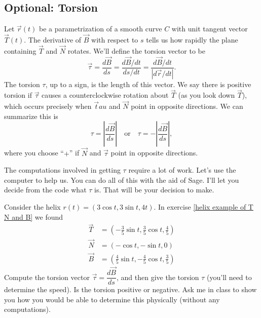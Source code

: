 \begin{challenge}
\begin{challenge}
\begin{challenge}
\subsection*{Optional: Torsion}


\begin{definition}[Torsion]
 Let $\vec r(t)$ be a parametrization of a smooth curve $C$ with unit tangent vector $\vec T(t)$.  
 The derivative of $\vec B$ with respect to $s$ tells us how rapidly the plane containing $\vec T$ and $\vec N$ rotates. We'll define the torsion vector to be 
%
 $$\vec \tau = \dfrac{d\vec B}{ds} = \dfrac{d\vec B/dt}{ds/dt}=\dfrac{d\vec B/dt}{|d\vec r/dt|}.$$ 
 The torsion $\tau$, up to a sign, is the length of this vector. We say there is positive torsion if $\vec \tau$ causes a counterclockwise rotation about $\vec T$ (as you look down $\vec T$), which occurs precisely when $\vec tau$ and $\vec N$ point in opposite directions. We can summarize this is $$\tau=\left|\dfrac{d\vec B}{ds}\right|\quad \text{or}\quad \tau=-\left|\dfrac{d\vec B}{ds}\right|,$$ where you choose ``$+$'' if $\vec N$ and $\vec \tau$ point in opposite directions. 
\end{definition}


The computations involved in getting $\tau$ require a lot of work. Let's use the computer to help us. You can do all of this with the aid of Sage.  I'll let you decide from the code what $\tau$ is.  That will be your decision to make. 

\begin{problem*}[Optional]
%
Consider the helix $r(t)=(3\cos t, 3\sin t, 4t)$. In exercise \ref{helix example of T N and B} we found 
\begin{align*}
 \vec T &= (-\frac{3}{5}\sin t,\frac{3}{5}\cos t,\frac{4}{5})\\
 \vec N &= (-\cos t,-\sin t,0)\\
 \vec B &= (\frac{4}{5}\sin t,-\frac{4}{5}\cos t,\frac{3}{5})
\end{align*}
Compute the torsion vector $\vec \tau=\dfrac{d\vec B}{ds}$, and then give the torsion $\tau$ (you'll need to determine the speed).  Is the torsion positive or negative.  Ask me in class to show you how you would be able to determine this physically (without any computations).
\end{problem*}


\end{challenge}
\end{challenge}
\end{challenge}
